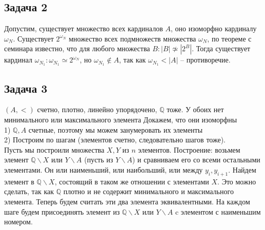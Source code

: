 \subsection*{Задача 2}
	Допустим, существует множество всех кардиналов $A$, оно изоморфно кардиналу $\omega_N$. Существует $2^{\omega_N}$ множество всех подмножеств множества $\omega_N$, по теореме с семинара известно, что для любого множества $B: |B| \not\simeq |2^B|$. Тогда существует кардинал $\omega_{N_1}: \omega_{N_1} \simeq 2^{\omega_N}$, но $\omega_{N_1} \notin A$, так как $\omega_{N_1} < |A|$ -- противоречие.
	\begin{comment}
	Пусть $X$ -- множество всех кардиналов, $X = \{x_i,\ |\ x_i \text{ -- кардинал}\}$ и $\alpha = \bigcup X$. $\alpha$ -- ординал, покажем, что $\alpha$ -- кардинал, то есть не существует биекции $\alpha \to \beta,\ \forall \beta < \alpha$\\
	Докажем от противного. Пусть существует ординал $\beta$, такой что $f: \alpha \to \beta$ -- биекция. $\beta < \alpha = \bigcup X$, то есть $\exists n \in \gamma$ такой что $\beta \in x_n$\\
	Рассмотрим тогда ограничение $f|_{x_{n+1}}$. Это биекция на подмножество $\beta' \subset \beta \in x_n$. То есть $|x_{n+1}| \leqslant |x_n|$. Но кардинал не равномощен никакому меньшему ординалу. Противоречие, следовательно $\bigcup X$ -- кардинал.
	\end{comment}
\vskip 0.4in

\subsection*{Задача 3}
	$(A, <)$ счетно, плотно, линейно упорядочено, $\mathbb{Q}$ тоже. У обоих нет минимального или максимального элемента Докажем, что они изоморфны\\
	1) $\mathbb{Q}, A$ счетные, поэтому мы можем занумеровать их элементы\\
	2) Построим по шагам (элементов счетно, следовательно шагов тоже).\\
	Пусть мы построили множества $X,Y$ из $n$ элементов. Построение: возьмем элемент $\mathbb{Q}\backslash X$ или $Y \backslash A$ (пусть из $Y \backslash A$) и сравниваем его со всеми остальными элементами. Он или наименьший, или наибольший, или между $y_i, y_{i+1}$. Найдем элемент в $\mathbb{Q}\backslash X$, состоящий в таком же отношении с элементами $X$. Это можно сделать, так как $\mathbb{Q}$ плотно и не содержит минимального и максимального элемента. Теперь будем считать эти два элемента эквивалентными. На каждом шаге будем присоединять элемент из $\mathbb{Q}\backslash X$ или $Y \backslash A$ c элементом с наименьшим номером.
\vskip 0.4in

